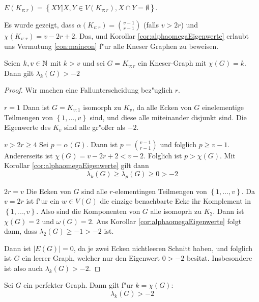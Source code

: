 \parindent 0pt $E(K_{v:r}) = \left\{ XY| X,Y \in V(K_{v:r}), X \cap Y = \emptyset \right\}$. 

\parindent 15pt Es wurde gezeigt, dass $\alpha(K_{v:r}) = \binom{v-1}{r-1}$ (falls $v >2r$) und $\chi(K_{v:r}) = v-2r+2$. Das, und  Korollar \ref{cor:alphaomegaEigenwerte} erlaubt uns Vermutung \ref{con:maincon} f"ur alle Kneser Graphen zu beweisen. 

\begin{proposition}
  Seien $k,v\in {\mathbb{N}}$ mit $k>v$ und sei $G= K_{v:r}$ ein Kneser-Graph mit $\chi(G) = k$. Dann gilt $\lambda_{k}(G) > -2$
\end{proposition}

\begin{proof}
  Wir machen eine Fallunterscheidung bez"uglich $r$. 

   {$r=1$} Dann ist $G=K_{v:1}$ isomorph zu $K_v$, da alle Ecken von $G$ einelementige Teilmengen von $\left\{ 1,\dots, v \right\}$ sind, und diese alle miteinander disjunkt sind. Die Eigenwerte des $K_v$ sind alle gr"o{\ss}er als $-2$. 

   {$v > 2r \geq 4 $} Sei $p = \alpha(G)$.  Dann ist $ p = \binom{v-1}{r-1}$ und folglich $ p \geq v-1$. Andererseits ist $\chi(G) = v-2r+2 < v-2$. Folglich ist $p > \chi(G)$. Mit  Korollar \ref{cor:alphaomegaEigenwerte} gilt dann \begin{equation*}
    \lambda_{k}(G) \geq \lambda_{p}(G) \geq 0 > -2
  \end{equation*}

   {$2r = v $} Die Ecken von $G$ sind alle $r$-elementingen Teilmengen von $\left\{ 1,\dots,v \right\}$. Da $v=2r$ ist f"ur ein $w\in V(G)$ die einzige benachbarte Ecke ihr Komplement in $\left\{ 1,\dots,v \right\}$. Also sind die Komponenten von $G$ alle isomoprh zu $K_{2}$. Dann ist $\chi(G) = 2$ und $\omega(G) = 2$. Aus Korollar \ref{cor:alphaomegaEigenwerte} folgt dann, dass $\lambda_{2}(G) \geq -1 > -2$ ist.

   Dann ist $|E(G)| = 0$, da je zwei Ecken nichtleeren Schnitt haben, und folglich ist $G$ ein leerer Graph, welcher nur den Eigenwert $0>-2$ besitzt. Insbesondere ist also auch $\lambda_{k}(G) > -2$.
\end{proof}

\begin{proposition}
  Sei $G$ ein perfekter Graph. Dann gilt f"ur $k=\chi(G)$:
  $$\lambda_{k}(G) > -2$$
\end{proposition}

